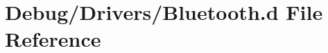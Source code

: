 \hypertarget{_bluetooth_8d}{}\section{Debug/\+Drivers/\+Bluetooth.d File Reference}
\label{_bluetooth_8d}

